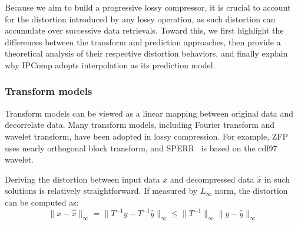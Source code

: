 Because we aim to build a progressive lossy compressor, it is crucial to account for the distortion introduced by any lossy operation, as such distortion can accumulate over successive data retrievals. Toward this, we first highlight the differences between the transform and prediction approaches, then provide a theoretical analysis of their respective distortion behaviors, and finally explain why IPComp adopts interpolation as its prediction model.

 

\subsubsection{Transform models}



Transform models can be viewed as a linear mapping between original data and decorrelate data. Many transform models, including Fourier transform and wavelet transform, have been adopted in lossy compression. For example, ZFP~\cite{zfp} uses nearly orthogonal block transform, and SPERR~\cite{sperr} is based on the cdf97 wavelet.

Deriving the distortion between input data $x$ and decompressed data $\hat{x}$ in such solutions is relatively straightforward. If measured by $L_\infty$ norm, the distortion can be computed as:
\[
\|x - \hat x\|_\infty = \|T^{-1}y - T^{-1}\hat y \|_\infty \leq  \|T^{-1}\|_\infty \|y - \hat y\|_\infty
\]

